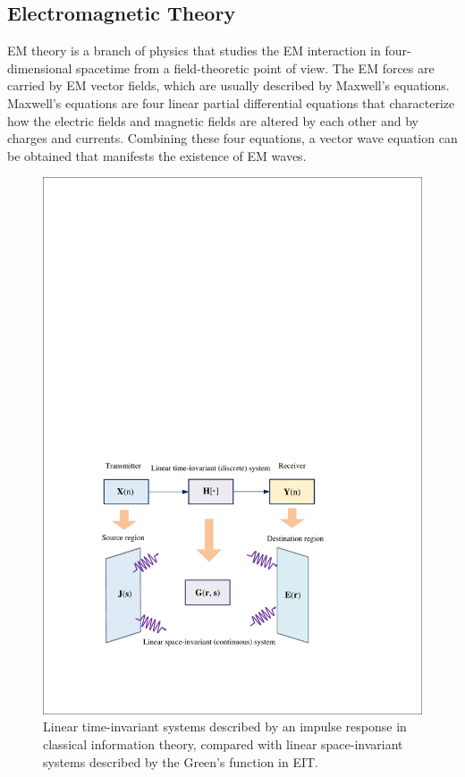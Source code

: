 \documentclass[journal,twocolumn]{IEEEtran}
\begin{document}
\subsection{Electromagnetic Theory}
\label{Sec_2_Subsec_3}
EM theory is a branch of physics that studies the EM interaction in four-dimensional spacetime from a field-theoretic point of view. The EM forces are carried by EM vector fields, which are usually described by Maxwell's equations. Maxwell's equations are four linear partial differential equations that characterize how the electric fields and magnetic fields are altered by each other and by charges and currents. Combining these four equations, a vector wave equation can be obtained that manifests the existence of EM waves. 
\begin{figure}
	\centering 
	\includegraphics[width=0.9\linewidth]{figures/LTI_LSI.pdf} 
	\caption{Linear time-invariant systems described by an impulse response in classical information theory, compared with linear space-invariant systems described by the Green's function in EIT.} 
	\label{fig:Shannon_Marzetta}
\end{figure}
\end{document}

